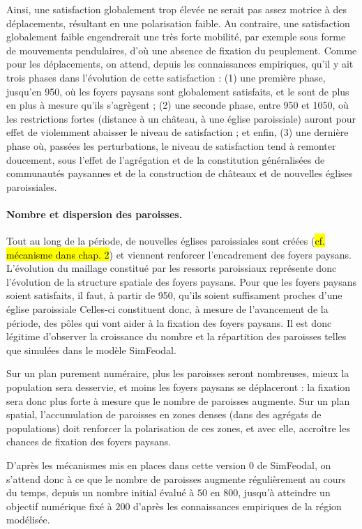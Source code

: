 Ainsi, une satisfaction globalement trop élevée ne serait pas assez motrice à des déplacements, résultant en une polarisation faible.
Au contraire, une satisfaction globalement faible engendrerait une très forte mobilité, par exemple sous forme de mouvements pendulaires, d'où une absence de fixation du peuplement.
Comme pour les déplacements, on attend, depuis les connaissances empiriques, qu'il y ait trois phases dans l'évolution de cette satisfaction :
(1) une première phase, jusqu'en 950, où les foyers paysans sont globalement satisfaits, et le sont de plus en plus à mesure qu'ils s'agrègent ;
(2) une seconde phase, entre 950 et 1050, où les restrictions fortes (distance à un château, à une église paroissiale) auront pour effet de violemment abaisser le niveau de satisfaction ;
et enfin, (3) une dernière phase où, passées les perturbations, le niveau de satisfaction tend à remonter doucement, sous l'effet de l'agrégation et de la constitution généralisées de communautés paysannes et de la construction de châteaux et de nouvelles églises paroissiales.

\paragraph{Nombre et dispersion des paroisses.}

Tout au long de la période, de nouvelles églises paroissiales sont créées (\hl{cf. mécanisme dans chap. 2}) et viennent renforcer l'encadrement des foyers paysans.
L'évolution du maillage constitué par les ressorts paroissiaux représente donc l'évolution de la structure spatiale des foyers paysans.
Pour que les foyers paysans soient satisfaits, il faut, à partir de 950, qu'ils soient suffisament proches d'une église paroissiale
Celles-ci constituent donc, à mesure de l'avancement de la période, des pôles qui vont aider à la fixation des foyers paysans.
Il est donc légitime d'observer la croissance du nombre et la répartition des paroisses telles que simulées dans le modèle SimFeodal.

Sur un plan purement numéraire, plus les paroisses seront nombreuses, mieux la population sera desservie, et moins les foyers paysans se déplaceront : la fixation sera donc plus forte à mesure que le nombre de paroisses augmente.
Sur un plan spatial, l'accumulation de paroisses en zones denses (dans des agrégats de populations) doit renforcer la polarisation de ces zones, et avec elle, accroître les chances de fixation des foyers paysans.

D'après les mécanismes mis en places dans cette version 0 de SimFeodal, on s'attend donc à ce que le nombre de paroisses augmente régulièrement au cours du temps, depuis un nombre initial évalué à $50$ en $800$, jusqu'à atteindre un objectif numérique fixé à $200$ d'après les connaissances empiriques de la région modélisée.

